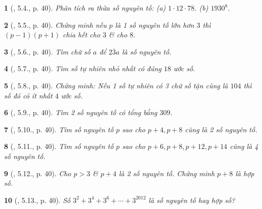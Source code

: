 \documentclass{article}
\newtheorem{baitoan}{}
\begin{document}
\begin{baitoan}[\cite{Binh_boi_duong_Toan_6_tap_1}, 5.4., p. 40]
	Phân tích ra thừa số nguyên tố: (a) $1\cdot12\cdot78$. (b) $1930^8$.
\end{baitoan}

\begin{baitoan}[\cite{Binh_boi_duong_Toan_6_tap_1}, 5.5., p. 40]
	Chứng minh nếu $p$ là 1 số nguyên tố lớn hơn $3$ thì $(p - 1)(p + 1)$ chia hết cho $3$ \& cho $8$.
\end{baitoan}

\begin{baitoan}[\cite{Binh_boi_duong_Toan_6_tap_1}, 5.6., p. 40]
	Tìm chữ số $a$ để $\overline{23a}$ là số nguyên tố.
\end{baitoan}

\begin{baitoan}[\cite{Binh_boi_duong_Toan_6_tap_1}, 5.7., p. 40]
	Tìm số tự nhiên nhỏ nhất có đúng $18$ ước số.
\end{baitoan}

\begin{baitoan}[\cite{Binh_boi_duong_Toan_6_tap_1}, 5.8., p. 40]
	Chứng minh: Nếu 1 số tự nhiên có 3 chữ số tận cùng là $104$ thì số đó có ít nhất $4$ ước số.
\end{baitoan}

\begin{baitoan}[\cite{Binh_boi_duong_Toan_6_tap_1}, 5.9., p. 40]
	Tìm 2 số nguyên tố có tổng bằng $309$.
\end{baitoan}

\begin{baitoan}[\cite{Binh_boi_duong_Toan_6_tap_1}, 5.10., p. 40]
	Tìm số nguyên tố $p$ sao cho $p + 4,p + 8$ cũng là 2 số nguyên tố.
\end{baitoan}

\begin{baitoan}[\cite{Binh_boi_duong_Toan_6_tap_1}, 5.11., p. 40]
	Tìm số nguyên tố $p$ sao cho $p + 6,p + 8,p + 12,p + 14$ cũng là 4 số nguyên tố.
\end{baitoan}

\begin{baitoan}[\cite{Binh_boi_duong_Toan_6_tap_1}, 5.12., p. 40]
	Cho $p > 3$ \& $p + 4$ là 2 số nguyên tố. Chứng minh $p + 8$ là hợp số.
\end{baitoan}

\begin{baitoan}[\cite{Binh_boi_duong_Toan_6_tap_1}, 5.13., p. 40]
	Số $3^2 + 3^4 + 3^6 + \cdots + 3^{2012}$ là số nguyên tố hay hợp số?
\end{baitoan}
\end{document}
